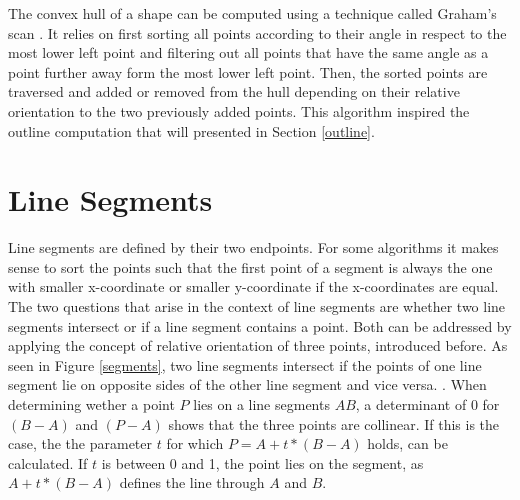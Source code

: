 The convex hull of a shape can be computed using a technique called Graham's scan \cite[Chapter~33]{cormen09}. It relies on first sorting all points according to their angle in respect to the most lower left point and filtering out all points that have the same angle as a point further away form the most lower left point. Then, the sorted points are traversed and added or removed from the hull depending on their relative orientation to the two previously added points. This algorithm inspired the outline computation that will presented in Section \ref{outline}.
\section{Line Segments}
\cite[Chapter~33]{cormen09}


Line segments are defined by their two endpoints. For some algorithms it makes sense to sort the points such that the first point of a segment is always the one with smaller x-coordinate or smaller y-coordinate if the x-coordinates are equal. The two questions that arise in the context of line segments are whether two line segments intersect or if a line segment contains a point. Both can be addressed by applying the concept of relative orientation of three points, introduced before. As seen in Figure \ref{segments}, two line segments intersect if the points of one line segment lie on opposite sides of the other line segment and vice versa. \cite[Chapter~33]{cormen09}. When determining wether a point $P$ lies on a line segments $AB$, a determinant of 0 for $(B-A)$ and $(P-A)$ shows that the three points are collinear. If this is the case, the the parameter $t$ for which $P = A + t*(B-A)$ holds, can be calculated. If $t$ is between 0 and 1, the point lies on the segment, as $A + t*(B-A)$ defines the line through $A$ and $B$.
